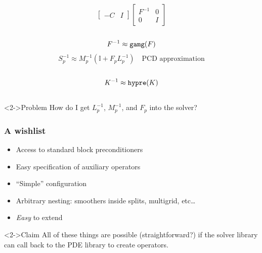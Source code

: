\documentclass[presentation,aspectratio=43]{beamer}
\begin{document}
\begin{frame}[fragile,t]
\begin{columns}[t]
\begin{column}{0.49\textwidth}
{\begin{equation*}
\begin{bmatrix}
          -C & I
        \end{bmatrix}
        \begin{bmatrix}
          F^{-1} & 0 \\
          0 & I
        \end{bmatrix}
      \end{equation*}
      \\[0.5\baselineskip]
      \begin{equation*}
        F^{-1} \approx \text{\texttt{gamg}}(F)
      \end{equation*}
      \begin{equation*}
        S_p^{-1} \approx M_p^{-1}(\mathbb{I} + F_p L_p^{-1})\quad\text{PCD approximation}
      \end{equation*}
      \\[0.5\baselineskip]
      \begin{equation*}
        K^{-1} \approx \text{\texttt{hypre}}(K)
      \end{equation*}
      }
    \end{column}
  \end{columns}

  \begin{alertblock}<2->{Problem}
    How do I get $L_p^{-1}$, $M_p^{-1}$, and $F_p$ into the solver?
  \end{alertblock}
\end{frame}

\begin{frame}
  \frametitle{A wishlist}
  \begin{itemize}
  \item Access to standard block preconditioners
  \item Easy specification of auxiliary operators
  \item ``Simple'' configuration
  \item Arbitrary nesting: smoothers inside splits, multigrid,
    etc\ldots
  \item \emph{Easy} to extend
  \end{itemize}

  \begin{alertblock}<2->{Claim}
    All of these things are possible (straightforward?) if the solver
    library can call back to the PDE library to create operators.
  \end{alertblock}
\end{frame}
\end{document}
